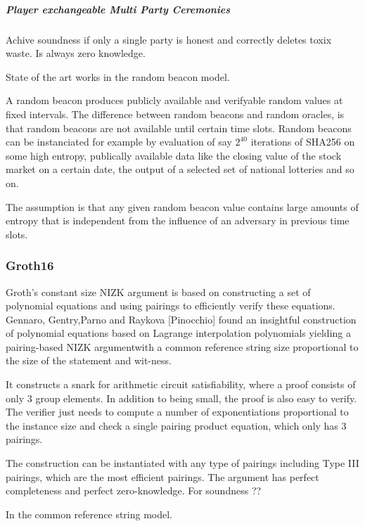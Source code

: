 \subparagraph{Player exchangeable Multi Party Ceremonies}

Achive soundness if only a single party is honest and correctly deletes toxix waste. Is always zero knowledge.

State of the art
works in the random beacon model. 

A random beacon produces publicly available and verifyable random values at fixed intervals. The difference between random beacons and random oracles, is that random beacons are not available until certain time slots. Random beacons can be instanciated for example by evaluation of say $2^{40}$ iterations of SHA256 on some high entropy, publically available data like the closing value of the stock market on a certain date, the output of a selected set of national lotteries and so on. 

The assumption is that any given random beacon value contains large amounts of entropy that is independent from the influence of an adversary in previous time slots. 




\subsubsection{Groth16}
Groth’s  constant  size  NIZK  argument  is  based  on  constructing  a  set  of  polynomial equations and using pairings to efficiently verify these equations. Gennaro, Gentry,Parno and Raykova [Pinocchio] found an insightful construction of polynomial equations based on Lagrange interpolation polynomials yielding a pairing-based NIZK argumentwith a common reference string size proportional to the size of the statement and wit-ness.

It constructs a snark  for arithmetic circuit satisfiability, where a proof consists of only 3 group elements. In addition to being small, the proof is also easy to verify. The verifier just needs to compute a number of exponentiations proportional to the instance size and check a single pairing product equation, which only  has  3  pairings.  

The  construction  can  be  instantiated  with  any  type  of  pairings including Type III pairings, which are the most efficient pairings. The argument has perfect completeness and perfect zero-knowledge. For soundness ?? 

In the common reference string model.

